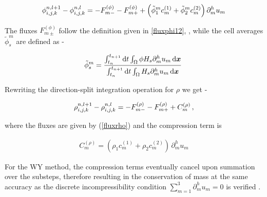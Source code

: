 \begin{align}
{\phi_{i,j,k}^{n,l+1} - \phi_{i,j,k}^{n,l}} = - F^{(\phi)}_{m-} - F^{(\phi)}_{m+} 
+ \Big( \tilde \phi_1^m c^{(1)}_m + \tilde \phi_2^m c^{(2)}_m \Big) \, \partial_{m}^h u_m 
\label{sumfpconsistent}
\end{align}




The fluxes $F^{(\phi)}_{m\pm}$ follow the definition given in \eqref{fluxphi12}, 
, while the cell averages $\tilde \phi_s^m$ are defined as - 


\begin{align}
\tilde \phi_s^m = \frac{\int_{t_n}^{t_{n+1}} {\textrm{d}}t \int_{\Omega}  \phi  H_s  
\partial_{m}^h u_m  \,  {\textrm{d}}\boldsymbol{x}}
{\int_{t_n}^{t_{n+1}} {\textrm{d}}t \int_{\Omega} H_s  \partial_{m}^h u_m \,{\textrm{d}}\boldsymbol{x}} \,
\label{cellphi2}
\end{align}


Rewriting the direction-split integration operation for $\rho$ we get - 




\begin{align}
{\rho_{i,j,k}^{n,l+1} - \rho_{i,j,k}^{n,l}} = - F^{(\rho)}_{m-} - F^{(\rho)}_{m+} + C_m^{(\rho)}\,,
\label{sumfrho}
\end{align}


where the fluxes are given by (\ref{fluxrho}) and the compression term is



\begin{align}
C_m^{(\rho)} =  \left( \rho_1 c^{(1)}_m + \rho_2 c^{(2)}_m \right) \,\partial_{m}^h u_m  
\label{central}
\end{align}



For the WY method, the compression terms eventually cancel upon 
summation over the substeps, therefore resulting in the conservation  
of mass at the same accuracy as the discrete incompressibility condition
$\sum_{m=1}^3 \partial_{m}^h u_m=0$ is verified 
. 




